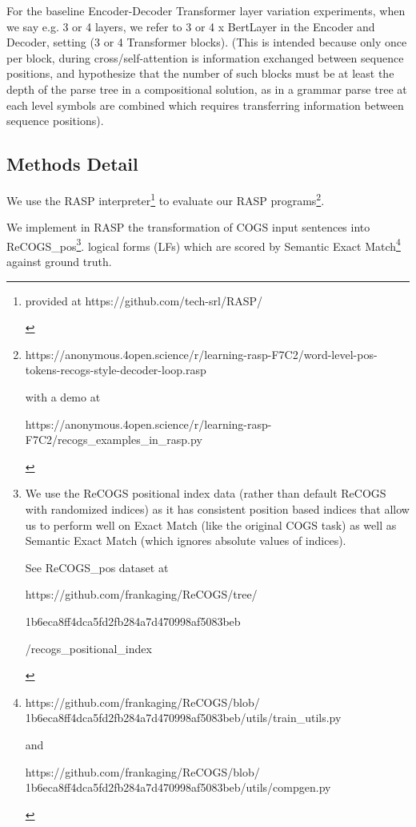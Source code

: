 \documentclass[11pt]{article}
\begin{document}
For the \cite{Wu2023} baseline Encoder-Decoder Transformer layer variation experiments, 
when we say e.g. 3 or 4 layers, we refer to 3 or 4 x BertLayer in the Encoder and Decoder, setting (3 or 4 Transformer blocks).
(This is intended because only once per block, during cross/self-attention is information exchanged between sequence positions, and \cite{Csordas2022} hypothesize that the number of such blocks must be at least the depth of the parse tree in a compositional solution, as in a grammar parse tree at each level symbols are combined which requires transferring information between sequence positions).
\clearpage

\subsection{Methods Detail}
\label{methods_detail}

We use the RASP \cite{Weiss2021} interpreter\footnote{\begin{footnotesize}provided at https://github.com/tech-srl/RASP/
\end{footnotesize}
} to evaluate our RASP programs\footnote{\begin{footnotesize}https://anonymous.4open.science/r/learning-rasp-F7C2/word-level-pos-tokens-recogs-style-decoder-loop.rasp

with a demo at

https://anonymous.4open.science/r/learning-rasp-F7C2/recogs\_examples\_in\_rasp.py\end{footnotesize}}.

We implement in RASP the transformation of COGS input sentences into ReCOGS\_pos\footnote{
\begin{footnotesize}We use the ReCOGS positional index data (rather than default ReCOGS with randomized indices) as it has consistent position based indices that allow us to perform well on Exact Match (like the original COGS task) as well as Semantic Exact Match (which ignores absolute values of indices).

See ReCOGS\_pos dataset at 

https://github.com/frankaging/ReCOGS/tree/

1b6eca8ff4dca5fd2fb284a7d470998af5083beb

/recogs\_positional\_index 
\end{footnotesize}
}. logical forms (LFs) which are scored by Semantic Exact Match\footnote{ 
\begin{footnotesize}https://github.com/frankaging/ReCOGS/blob/
1b6eca8ff4dca5fd2fb284a7d470998af5083beb/utils/train\_utils.py

and

https://github.com/frankaging/ReCOGS/blob/
1b6eca8ff4dca5fd2fb284a7d470998af5083beb/utils/compgen.py
\end{footnotesize}
} against ground truth.
\end{document}
